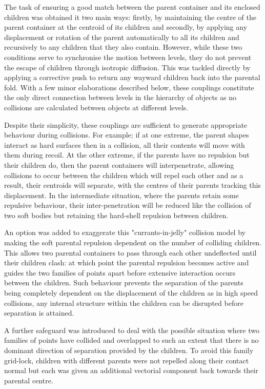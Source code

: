 The task of ensuring a good match between the parent container and its enclosed
children was obtained it two main ways: firstly, by maintaining the centre of the
parent container at the centroid of its children and secondly, by applying any
displacement or rotation of the parent automatically to all its children and recursively
to any children that they also contain.   However, while these two conditions serve
to synchronise the motion between levels, they do not prevent the escape of children
through isotropic diffusion.   This was tackled directly by applying a corrective push
to return any wayward children back into the parental fold.   With a few minor elaborations
described below, these couplings constitute the only direct connection between levels in the
hierarchy of objects as no collisions are calculated between objects at different levels.

Despite their simplicity, these couplings are sufficient to generate appropriate
behaviour during collisions.   For example; if at one extreme, the parent shapes interact
as hard surfaces then in a collision, all their contents will move with them during
recoil.   At the other extreme, if the parents have no repulsion but their children do,
then the parent containers will interpenetrate, allowing collisions to occur between
the children which will repel each other and as a result, their centroids will 
separate, with the centres of their parents tracking this displacement.   In the intermediate
situation, where the parents retain some repulsive behaviour, their inter-penetration
will be reduced like the collision of two soft bodies but retaining the hard-shell
repulsion between children.   

An option was added to exaggerate this "currants-in-jelly" collision model by making
the soft parental repulsion dependent on the number of colliding children.   This
allows two parental containers to pass through each other undeflected until their
children clash: at which point the parental repulsion becomes active and guides the
two families of points apart before extensive interaction occurs between the 
children.   Such behaviour prevents the separation of the parents being completely
dependent on the displacement of the children as in high speed collisions, any
internal structure within the children can be disrupted before separation is attained.

A further safeguard was introduced to deal with the possible situation where two
families of points have collided and overlapped to such an extent that there is no
dominant direction of separation provided by the children.   To avoid this family
grid-lock, children with different parents were not repelled along their contact
normal but each was given an additional vectorial component back towards their
parental centre.

